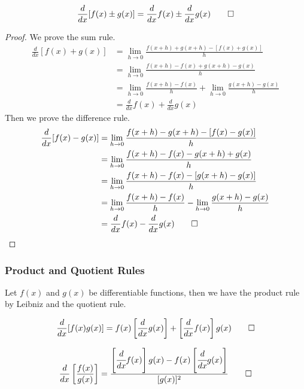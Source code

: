 \begin{theorem}
    \[\frac{d}{dx}[f(x)\pm g(x)]=\frac{d}{dx}f(x)\pm \frac{d}{dx}g(x)\qedhere\]
\end{theorem}
\begin{proof}
    We prove the sum rule.
    \begin{align*}
        \frac{d}{dx}[f(x)+g(x)]&=\lim_{h\to 0}\frac{f(x+h)+g(x+h)-[f(x)+g(x)]}{h}\\
        &=\lim_{h\to 0}\frac{f(x+h)-f(x)+g(x+h)-g(x)}{h}\\
        &=\lim_{h\to 0}\frac{f(x+h)-f(x)}{h}+\lim_{h\to 0}\frac{g(x+h)-g(x)}{h}\\
        &=\frac{d}{dx}f(x)+\frac{d}{dx}g(x)
    \end{align*}
    Then we prove the difference rule.
    \begin{align*}
        \frac{d}{dx}[f(x)-g(x)]&=\lim_{h\to 0}\frac{f(x+h)-g(x+h)-[f(x)-g(x)]}{h}\\
        &=\lim_{h\to 0}\frac{f(x+h)-f(x)-g(x+h)+g(x)}{h}\\
        &=\lim_{h\to 0}\frac{f(x+h)-f(x)-[g(x+h)-g(x)]}{h}\\
        &=\lim_{h\to 0}\frac{f(x+h)-f(x)}{h}-\lim_{h\to 0}\frac{g(x+h)-g(x)}{h}\\
        &=\frac{d}{dx}f(x)-\frac{d}{dx}g(x)\qedhere
    \end{align*}
\end{proof}

\subsubsection{Product and Quotient Rules}
Let \(f(x)\) and \(g(x)\) be differentiable functions, then we have the
product rule by Leibniz and the quotient rule.
\begin{theorem}
    \[\frac{d}{dx}[f(x)g(x)]=f(x)\left[\frac{d}{dx}g(x)\right]
    +\left[\frac{d}{dx}f(x)\right]g(x)\qedhere\]
\end{theorem}
\begin{theorem}
    \[\frac{d}{dx}\left[\frac{f(x)}{g(x)}\right]=\frac{\left[\cfrac{d}{dx}f(x)\right]g(x)
    -f(x)\left[\cfrac{d}{dx}g(x)\right]}{[g(x)]^2}\qedhere\]
\end{theorem}

